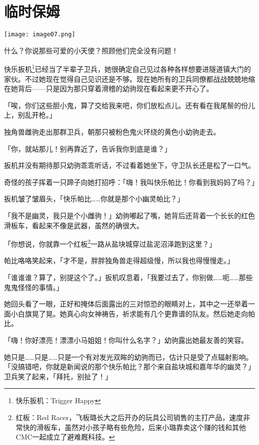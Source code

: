 \chapter{临时保姆}

\texttt{[image: image07.png]}


\begin{intro}
    什么？你说那些可爱的小天使？照顾他们完全没有问题！
\end{intro}


快乐扳机\footnote{快乐扳机：Trigger Happy}已经当了半辈子卫兵，她很确定自己见过各种各样想要进隧道镇大门的家伙。不过她现在觉得自己见识还是不够。现在她所有的卫兵同僚都战战兢兢地缩在她背后——只是因为那只穿着滑稽的幼驹现在看起来更不开心了。

「唉，你们这些胆小鬼，算了交给我来吧，你们放松点儿。还有看在我尾鬃的份儿上，别乱开枪。」

独角兽雌驹走出那群卫兵，朝那只被粉色鬼火环绕的黄色小幼驹走去。

「你，就站那儿！别再靠近了，告诉我你到底是谁？」

扳机并没有期待那只幼驹乖乖听话，不过看着她坐下，守卫队长还是松了一口气。

奇怪的孩子挥着一只蹄子向她打招呼：「嗨！我叫快乐帕比！你看到我妈妈了吗？」

扳机皱了皱眉头，「快乐帕比……你就是那个小幽灵帕比？」

「我不是幽灵，我只是个小雌驹！」幼驹嘟起了嘴，她背后还背着一个长长的红色滑板车，看起来不像是武器，虽然的确很大。

「你想说，你就靠一个红板\footnote{红板：Red Racer，飞板璐长大之后开办的玩具公司销售的主打产品，速度非常快的滑板车，虽然对小孩子略有些危险，后来小璐靠卖这个赚的钱和其他CMC一起成立了避难厩科技。}一路从盐块城穿过盐泥沼泽跑到这里？」

帕比咯咯笑起来，「才不是，胖胖独角兽走得超级慢，所以我也得慢慢走。」

「谁谁谁？算了，别提这个了。」扳机叹息着，「我要过去了，你别做……呃……那些鬼鬼怪怪的事情。」

她回头看了一眼，正好和掩体后面露出的三对惊恐的眼睛对上，其中之一还举着一面小白旗晃了晃。她真心向女神祷告，祈求能有几个更靠谱的队友。然后她走向帕比。

「嗨！你好漂亮！漂漂小马姐姐！你叫什么名字？」幼驹露出她最友善的笑容。

她只是……只是……只是一个有对发光双眸的幼驹而已，估计只是受了点辐射影响。「没搞错吧，你就是新闻说的那个快乐帕比？那个来自盐块城和嘉年华的幽灵？」卫兵笑了起来，「拜托，别扯了！」

